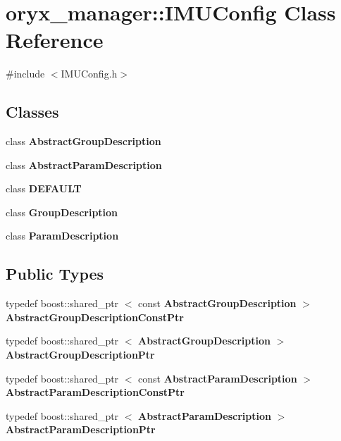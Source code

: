 \section{oryx\-\_\-manager\-:\-:\-I\-M\-U\-Config \-Class \-Reference}
\label{classoryx__manager_1_1IMUConfig}


{\ttfamily \#include $<$\-I\-M\-U\-Config.\-h$>$}

\subsection*{\-Classes}
\begin{DoxyCompactItemize}
\item 
class {\bf \-Abstract\-Group\-Description}
\item 
class {\bf \-Abstract\-Param\-Description}
\item 
class {\bf \-D\-E\-F\-A\-U\-L\-T}
\item 
class {\bf \-Group\-Description}
\item 
class {\bf \-Param\-Description}
\end{DoxyCompactItemize}
\subsection*{\-Public \-Types}
\begin{DoxyCompactItemize}
\item 
typedef boost\-::shared\-\_\-ptr\*
$<$ const \*
{\bf \-Abstract\-Group\-Description} $>$ {\bf \-Abstract\-Group\-Description\-Const\-Ptr}
\item 
typedef boost\-::shared\-\_\-ptr\*
$<$ {\bf \-Abstract\-Group\-Description} $>$ {\bf \-Abstract\-Group\-Description\-Ptr}
\item 
typedef boost\-::shared\-\_\-ptr\*
$<$ const \*
{\bf \-Abstract\-Param\-Description} $>$ {\bf \-Abstract\-Param\-Description\-Const\-Ptr}
\item 
typedef boost\-::shared\-\_\-ptr\*
$<$ {\bf \-Abstract\-Param\-Description} $>$ {\bf \-Abstract\-Param\-Description\-Ptr}
\end{DoxyCompactItemize}
